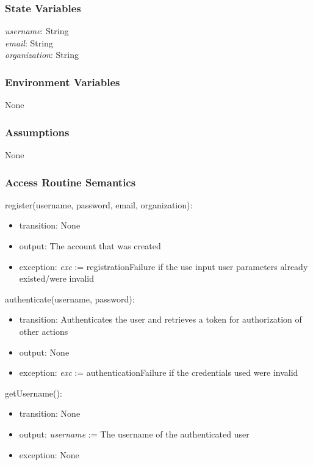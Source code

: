 \documentclass[12pt, titlepage]{article}
\begin{document}
\subsubsection{State Variables}

\textit{username}: String \\
\textit{email}: String \\
\textit{organization}: String \\

\subsubsection{Environment Variables}

None

\subsubsection{Assumptions}

None

\subsubsection{Access Routine Semantics}

\noindent register(username, password, email, organization):
\begin{itemize}
\item transition: None
\item output: The account that was created
\item exception: \textit{exc} := registrationFailure if the use input user parameters already existed/were invalid
\end{itemize}

\noindent authenticate(username, password):
\begin{itemize}
\item transition: Authenticates the user and retrieves a token for authorization of other actions 
\item output: None
\item exception: \textit{exc} := authenticationFailure if the credentials used were invalid
\end{itemize}

\noindent getUsername():
\begin{itemize}
\item transition: None
\item output: \textit{username} := The username of the authenticated user
\item exception: None
\end{itemize}
\end{document}
